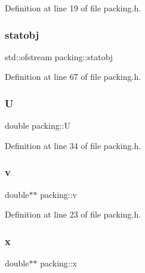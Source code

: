 Definition at line 19 of file packing.\+h.

\mbox{\label{classpacking_a7d70ed77edfe21649b824f01d26432d0}} 
\subsubsection{\texorpdfstring{statobj}{statobj}}
{\footnotesize\ttfamily std\+::ofstream packing\+::statobj\hspace{0.3cm}{\ttfamily [protected]}}



Definition at line 67 of file packing.\+h.

\mbox{\label{classpacking_a4412ad37535700fcf62fb9e3d87c2c49}} 
\subsubsection{\texorpdfstring{U}{U}}
{\footnotesize\ttfamily double packing\+::U\hspace{0.3cm}{\ttfamily [protected]}}



Definition at line 34 of file packing.\+h.

\mbox{\label{classpacking_a25a8813f1efa77beae413fe335bec3a7}} 
\subsubsection{\texorpdfstring{v}{v}}
{\footnotesize\ttfamily double$\ast$$\ast$ packing\+::v\hspace{0.3cm}{\ttfamily [protected]}}



Definition at line 23 of file packing.\+h.

\mbox{\label{classpacking_a3b56d5b429817628d1cd764f4a62827d}} 
\subsubsection{\texorpdfstring{x}{x}}
{\footnotesize\ttfamily double$\ast$$\ast$ packing\+::x\hspace{0.3cm}{\ttfamily [protected]}}



